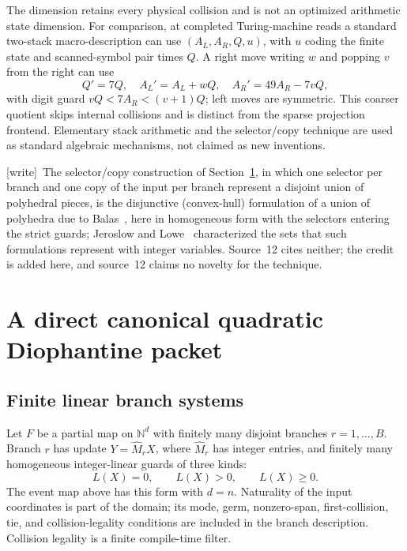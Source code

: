 \documentclass[11pt,letterpaper]{article}
\numberwithin{equation}{section}
\theoremstyle{definition}
\theoremstyle{remark}
\newcommand{\NN}{\mathbb N}
\newcommand{\wtag}{\textup{[write]}}
\begin{document}
The dimension retains every physical collision and is not an optimized arithmetic state dimension. For comparison, at completed Turing-machine reads a standard two-stack macro-description can use $(A_L,A_R,Q,u)$, with $u$ coding the finite state and scanned-symbol pair times $Q$. A right move writing $w$ and popping $v$ from the right can use
\[
 Q'=7Q,\quad A_L'=A_L+wQ,\quad A_R'=49A_R-7vQ,
\]
with digit guard $vQ<7A_R<(v+1)Q$; left moves are symmetric. This coarser quotient skips internal collisions and is distinct from the sparse projection frontend. Elementary stack arithmetic and the selector/copy technique are used as standard algebraic mechanisms, not claimed as new inventions.

\wtag\ The selector/copy construction of Section~\ref{smc:cs:sec:packet}, in which one selector per branch and one copy of the input per branch represent a disjoint union of polyhedral pieces, is the disjunctive (convex-hull) formulation of a union of polyhedra due to Balas~\cite{balas1979,balas1985}, here in homogeneous form with the selectors entering the strict guards; Jeroslow and Lowe~\cite{jeroslowlowe} characterized the sets that such formulations represent with integer variables. Source~12 cites neither; the credit is added here, and source~12 claims no novelty for the technique.

\section{A direct canonical quadratic Diophantine packet}\label{smc:cs:sec:packet}
\subsection{Finite linear branch systems}
Let $F$ be a partial map on $\NN^d$ with finitely many disjoint branches $r=1,\ldots,B$. Branch $r$ has update $Y=\widehat M_r X$, where $\widehat M_r$ has integer entries, and finitely many homogeneous integer-linear guards of three kinds:
\[
 L(X)=0,\qquad L(X)>0,\qquad L(X)\ge0.
\]
The event map above has this form with $d=n$. Naturality of the input coordinates is part of the domain; its mode, germ, nonzero-span, first-collision, tie, and collision-legality conditions are included in the branch description. Collision legality is a finite compile-time filter.
\end{document}
